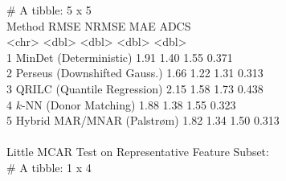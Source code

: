 \documentclass[11pt,oneside]{book}
\begin{document}
\begin{routput}
\# A tibble: 5 x 5\\
\hspace*{1em}Method \hspace*{11.5em}RMSE NRMSE \hspace*{1em}MAE \hspace*{1.2em}ADCS\\
\hspace*{1em}\textless{}chr\textgreater{} \hspace*{13em}\textless{}dbl\textgreater{} \hspace*{0.8em}\textless{}dbl\textgreater{} \hspace*{1em}\textless{}dbl\textgreater{} \hspace*{1.2em}\textless{}dbl\textgreater{}\\
1 MinDet (Deterministic) \hspace*{4.2em}1.91 \hspace*{1.2em}1.40 \hspace*{1.2em}1.55 \hspace*{1.2em}0.371\\
2 Perseus (Downshifted Gauss.) \hspace*{1.2em}1.66 \hspace*{1.2em}1.22 \hspace*{1.2em}1.31 \hspace*{1.2em}0.313\\
3 QRILC (Quantile Regression) \hspace*{1.8em}2.15 \hspace*{1.2em}1.58 \hspace*{1.2em}1.73 \hspace*{1.2em}0.438\\
4 $k$-NN (Donor Matching) \hspace*{4.5em}1.88 \hspace*{1.2em}1.38 \hspace*{1.2em}1.55 \hspace*{1.2em}0.323\\
5 Hybrid MAR/MNAR (Palstr{\o}m) \hspace*{1.5em}1.82 \hspace*{1.2em}1.34 \hspace*{1.2em}1.50 \hspace*{1.2em}0.313\\
\\
Little MCAR Test on Representative Feature Subset:\\
\# A tibble: 1 x 4\\

\end{routput}
\end{document}
